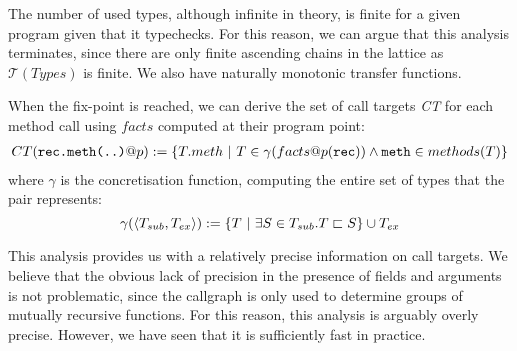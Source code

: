 The number of used types, although infinite in theory, is finite for a given
program given that it typechecks. For this reason, we can argue that this
analysis terminates, since there are only finite ascending chains in the
lattice as $\mathcal{T}(Types)$ is finite. We also have naturally monotonic
transfer functions.

When the fix-point is reached, we can derive the set of call targets \emph{CT}
for each method call using $facts$ computed at their program point:
\begin{eqnarray*}
    CT(\verb/rec.meth(..)/ @ p) := \{ T.meth ~|~ T \in \gamma(facts@p(\verb/rec/)) \land \verb/meth/ \in methods(T) \}
\end{eqnarray*}
where $\gamma$ is the concretisation function, computing the entire set of
types that the pair represents:
$$
\gamma(\langle T_{sub}, T_{ex} \rangle ) := \{ T ~|~ \exists S \in T_{sub}. T \sqsubset S\} \cup T_{ex}
$$

This analysis provides us with a relatively precise information on call
targets. We believe that the obvious lack of precision in the presence of
fields and arguments is not problematic, since the callgraph is only used to
determine groups of mutually recursive functions. For this reason, this
analysis is arguably overly precise. However, we have seen that it is
sufficiently fast in practice.
